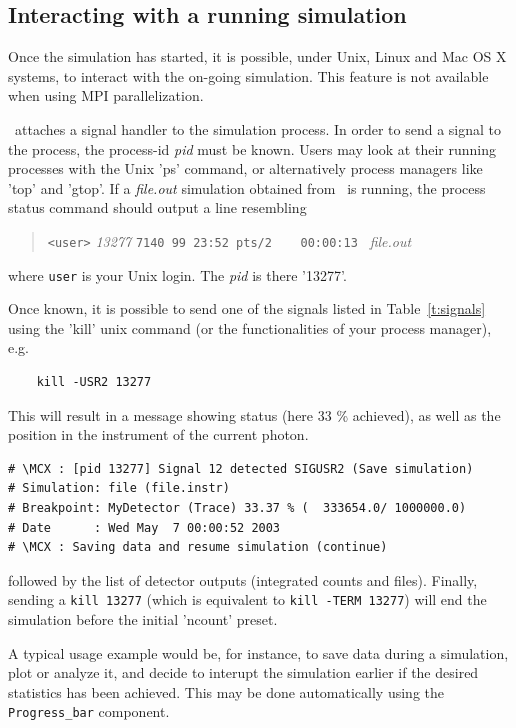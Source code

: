 \subsection{Interacting with a running simulation}

Once the simulation has started, it is possible, under Unix, Linux and Mac OS X systems, to interact with the on-going simulation. This feature is not available when using MPI parallelization.

\MCX\ attaches a signal handler to the simulation process. In order to send a signal to the process, the process-id \textit{pid} must be known. Users may look at their running processes with the Unix 'ps' command, or alternatively process managers like 'top' and 'gtop'.
If a \textit{file.out} simulation obtained from \MCX\ is running, the process status command should output a line resembling
\begin{quote}
  \verb|<user>| \textit{13277} \verb|7140 99 23:52 pts/2    00:00:13 | \textit{file.out}\\
\end{quote}
where \verb+user+ is your Unix login. The \textit{pid} is there '13277'.

Once known, it is possible to send one of the signals listed in Table~\ref{t:signals} using the 'kill' unix command (or the functionalities of your process manager), e.g.
\begin{verbatim}
    kill -USR2 13277
\end{verbatim}
This will result in a message showing status (here 33 \% achieved), as well as the position in the instrument of the current photon.
\begin{verbatim}
# \MCX : [pid 13277] Signal 12 detected SIGUSR2 (Save simulation)
# Simulation: file (file.instr)
# Breakpoint: MyDetector (Trace) 33.37 % (  333654.0/ 1000000.0)
# Date      : Wed May  7 00:00:52 2003
# \MCX : Saving data and resume simulation (continue)
\end{verbatim}
followed by the list of detector outputs (integrated counts and files). Finally, sending a \verb+kill 13277+ (which is equivalent to \verb+kill -TERM 13277+) will end the simulation before the initial 'ncount' preset.

A typical usage example would be, for instance, to save data during a
simulation, plot or analyze it, and decide to interupt the simulation
earlier if the desired statistics has been achieved. This may be done automatically using the \verb+Progress_bar+ component.

